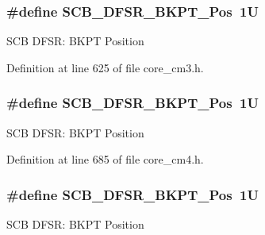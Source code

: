 \subsubsection[{\texorpdfstring{S\+C\+B\+\_\+\+D\+F\+S\+R\+\_\+\+B\+K\+P\+T\+\_\+\+Pos}{SCB_DFSR_BKPT_Pos}}]{\setlength{\rightskip}{0pt plus 5cm}\#define S\+C\+B\+\_\+\+D\+F\+S\+R\+\_\+\+B\+K\+P\+T\+\_\+\+Pos~1U}\hypertarget{group___c_m_s_i_s___s_c_b_gaf28fdce48655f0dcefb383aebf26b050}{}\label{group___c_m_s_i_s___s_c_b_gaf28fdce48655f0dcefb383aebf26b050}
S\+CB D\+F\+SR\+: B\+K\+PT Position 

Definition at line 625 of file core\+\_\+cm3.\+h.

\subsubsection[{\texorpdfstring{S\+C\+B\+\_\+\+D\+F\+S\+R\+\_\+\+B\+K\+P\+T\+\_\+\+Pos}{SCB_DFSR_BKPT_Pos}}]{\setlength{\rightskip}{0pt plus 5cm}\#define S\+C\+B\+\_\+\+D\+F\+S\+R\+\_\+\+B\+K\+P\+T\+\_\+\+Pos~1U}\hypertarget{group___c_m_s_i_s___s_c_b_gaf28fdce48655f0dcefb383aebf26b050}{}\label{group___c_m_s_i_s___s_c_b_gaf28fdce48655f0dcefb383aebf26b050}
S\+CB D\+F\+SR\+: B\+K\+PT Position 

Definition at line 685 of file core\+\_\+cm4.\+h.

\subsubsection[{\texorpdfstring{S\+C\+B\+\_\+\+D\+F\+S\+R\+\_\+\+B\+K\+P\+T\+\_\+\+Pos}{SCB_DFSR_BKPT_Pos}}]{\setlength{\rightskip}{0pt plus 5cm}\#define S\+C\+B\+\_\+\+D\+F\+S\+R\+\_\+\+B\+K\+P\+T\+\_\+\+Pos~1U}\hypertarget{group___c_m_s_i_s___s_c_b_gaf28fdce48655f0dcefb383aebf26b050}{}\label{group___c_m_s_i_s___s_c_b_gaf28fdce48655f0dcefb383aebf26b050}
S\+CB D\+F\+SR\+: B\+K\+PT Position 

